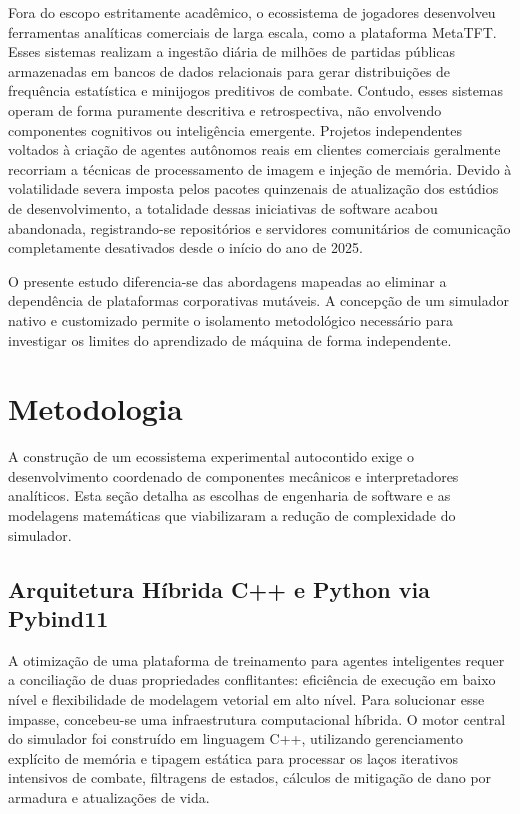 \documentclass[12pt]{article}
\begin{document}
Fora do escopo estritamente acadêmico, o ecossistema de jogadores desenvolveu ferramentas analíticas comerciais de larga escala, como a plataforma MetaTFT. Esses sistemas realizam a ingestão diária de milhões de partidas públicas armazenadas em bancos de dados relacionais para gerar distribuições de frequência estatística e minijogos preditivos de combate. Contudo, esses sistemas operam de forma puramente descritiva e retrospectiva, não envolvendo componentes cognitivos ou inteligência emergente. Projetos independentes voltados à criação de agentes autônomos reais em clientes comerciais geralmente recorriam a técnicas de processamento de imagem e injeção de memória. Devido à volatilidade severa imposta pelos pacotes quinzenais de atualização dos estúdios de desenvolvimento, a totalidade dessas iniciativas de software acabou abandonada, registrando-se repositórios e servidores comunitários de comunicação completamente desativados desde o início do ano de 2025.

O presente estudo diferencia-se das abordagens mapeadas ao eliminar a dependência de plataformas corporativas mutáveis. A concepção de um simulador nativo e customizado permite o isolamento metodológico necessário para investigar os limites do aprendizado de máquina de forma independente.

\section{Metodologia} \label{sec:metodologia}

A construção de um ecossistema experimental autocontido exige o desenvolvimento coordenado de componentes mecânicos e interpretadores analíticos. Esta seção detalha as escolhas de engenharia de software e as modelagens matemáticas que viabilizaram a redução de complexidade do simulador.

\subsection{Arquitetura Híbrida C++ e Python via Pybind11}
A otimização de uma plataforma de treinamento para agentes inteligentes requer a conciliação de duas propriedades conflitantes: eficiência de execução em baixo nível e flexibilidade de modelagem vetorial em alto nível. Para solucionar esse impasse, concebeu-se uma infraestrutura computacional híbrida. O motor central do simulador foi construído em linguagem C++, utilizando gerenciamento explícito de memória e tipagem estática para processar os laços iterativos intensivos de combate, filtragens de estados, cálculos de mitigação de dano por armadura e atualizações de vida.
\end{document}
